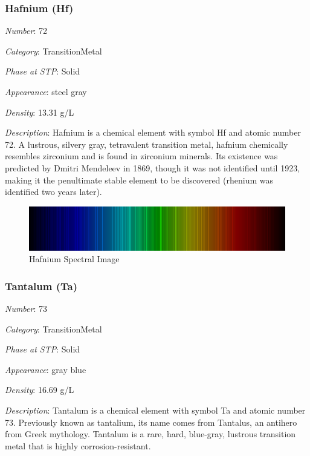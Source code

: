 \documentclass{article}
\begin{document}
\hypertarget{subsubsection::Hf}{}\subsubsection{Hafnium (Hf)}

\textit{Number}: 72

\textit{Category}: TransitionMetal

\textit{Phase at STP}: Solid

\textit{Appearance}: steel gray

\textit{Density}: 13.31 g/L

\textit{Description}: Hafnium is a chemical element with symbol Hf and atomic number 72. A lustrous, silvery gray, tetravalent transition metal, hafnium chemically resembles zirconium and is found in zirconium minerals. Its existence was predicted by Dmitri Mendeleev in 1869, though it was not identified until 1923, making it the penultimate stable element to be discovered (rhenium was identified two years later).

\immediate{}
\begin{figure}[!ht]
    \centering
    \includegraphics[width=12cm]{./resources/spectral_img/Hafnium_spectrum_visible.png}
    \caption{Hafnium Spectral Image}
\end{figure}

\hypertarget{subsubsection::Ta}{}\subsubsection{Tantalum (Ta)}

\textit{Number}: 73

\textit{Category}: TransitionMetal

\textit{Phase at STP}: Solid

\textit{Appearance}: gray blue

\textit{Density}: 16.69 g/L

\textit{Description}: Tantalum is a chemical element with symbol Ta and atomic number 73. Previously known as tantalium, its name comes from Tantalus, an antihero from Greek mythology. Tantalum is a rare, hard, blue-gray, lustrous transition metal that is highly corrosion-resistant.
\end{document}
